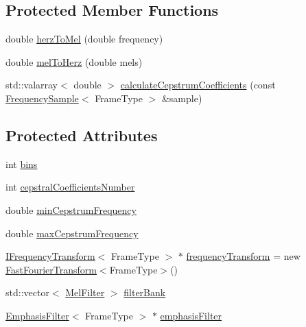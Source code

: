 \subsection*{Protected Member Functions}
\begin{DoxyCompactItemize}
\item 
double \hyperlink{classspeech_1_1vectorizer_1_1MFCCVectorizer_ac519c16aa05a93d8c9cfbeec6d90f9d9}{herz\+To\+Mel} (double frequency)
\item 
double \hyperlink{classspeech_1_1vectorizer_1_1MFCCVectorizer_ab92ba6f1f5e52befdbb6ce5d6e37b870}{mel\+To\+Herz} (double mels)
\item 
std\+::valarray$<$ double $>$ \hyperlink{classspeech_1_1vectorizer_1_1MFCCVectorizer_a2ef3bd222534d0b5f9b79d146de969af}{calculate\+Cepstrum\+Coefficients} (const \hyperlink{classspeech_1_1raw__data_1_1FrequencySample}{Frequency\+Sample}$<$ Frame\+Type $>$ \&sample)
\end{DoxyCompactItemize}
\subsection*{Protected Attributes}
\begin{DoxyCompactItemize}
\item 
int \hyperlink{classspeech_1_1vectorizer_1_1MFCCVectorizer_a179a54e359180354c417f980b222f1eb}{bins}
\item 
int \hyperlink{classspeech_1_1vectorizer_1_1MFCCVectorizer_a5f5083150768e6c9aad1777502e59a58}{cepstral\+Coefficients\+Number}
\item 
double \hyperlink{classspeech_1_1vectorizer_1_1MFCCVectorizer_aa457579c8cac5d821a9cc6881d08124b}{min\+Cepstrum\+Frequency}
\item 
double \hyperlink{classspeech_1_1vectorizer_1_1MFCCVectorizer_a50431c541e9cba136395055ffd076c70}{max\+Cepstrum\+Frequency}
\item 
\hyperlink{classspeech_1_1transform_1_1IFrequencyTransform}{I\+Frequency\+Transform}$<$ Frame\+Type $>$ $\ast$ \hyperlink{classspeech_1_1vectorizer_1_1MFCCVectorizer_ac63aa92505370502b5e7c456bf8a8255}{frequency\+Transform} = new \hyperlink{classspeech_1_1transform_1_1FastFourierTransform}{Fast\+Fourier\+Transform}$<$Frame\+Type$>$()
\item 
std\+::vector$<$ \hyperlink{classspeech_1_1vectorizer_1_1MFCCVectorizer_1_1MelFilter}{Mel\+Filter} $>$ \hyperlink{classspeech_1_1vectorizer_1_1MFCCVectorizer_ab24511b7854870d534bdc408ddaf43bb}{filter\+Bank}
\item 
\hyperlink{classspeech_1_1raw__data_1_1filtering_1_1EmphasisFilter}{Emphasis\+Filter}$<$ Frame\+Type $>$ $\ast$ \hyperlink{classspeech_1_1vectorizer_1_1MFCCVectorizer_a36f6a48cc775f2b7d12f8fbfc103c448}{emphasis\+Filter}
\end{DoxyCompactItemize}


